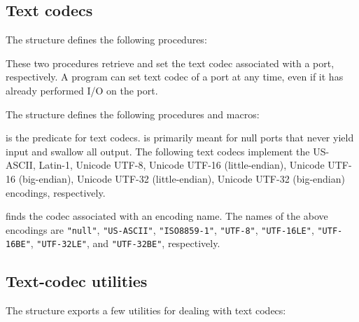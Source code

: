 \subsection{Text codecs}
\label{text-codecs}

The  structure defines the following procedures:
%
\begin{protos}
\end{protos}
%
These two procedures retrieve and set the text codec associated with a
port, respectively.  A program can set text codec of a port at any
time, even if it has already performed I/O on the port.

The  structure defines the following procedures and macros:

\begin{protos}
\end{protos}
%
 is the predicate for text codecs.
 is primarily meant for null ports that never
yield input and swallow all output.  The following text codecs
implement the US-ASCII, Latin-1, Unicode UTF-8, Unicode UTF-16
(little-endian), Unicode UTF-16 (big-endian), Unicode UTF-32
(little-endian), Unicode UTF-32 (big-endian) encodings, respectively.

 finds the codec associated with an encoding
name.  The names of the above encodings are \verb|"null"|,
\verb|"US-ASCII"|, \verb|"ISO8859-1"|, \verb|"UTF-8"|,
\verb|"UTF-16LE"|, \verb|"UTF-16BE"|, \verb|"UTF-32LE"|, and
\verb|"UTF-32BE"|, respectively.

\subsection{Text-codec utilities}

The  structure exports a few utilities for
dealing with text codecs:

